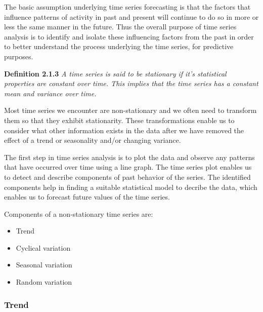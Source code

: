       \vspace{1em}

      The basic assumption underlying time series forecasting is that the factors that influence patterns of activity in past and present will continue to do so in more or less the same manner in the future. Thus the overall purpose of time series analysis is to identify and isolate these influencing factors from the past in order to better understand the process underlying the time series, for predictive purposes.

      \vspace{1em}

      \textbf{Definition 2.1.3} \cite{Watson2025} \textit{A time series is said to be stationary if it's statistical properties are constant over time. This implies that the time series has a constant mean and variance over time.}

      \vspace{1em}

      Most time series we encounter are non-stationary and we often need to transform them so that they exhibit stationarity. These transformations enable us to consider what other information exists in the data after we have removed the effect of a trend or seasonality and/or changing variance.

      \vspace{1em}

      The first step in time series analysis is to plot the data and observe any patterns that have occurred over time using a line graph. The time series plot enables us to detect and describe components of past behavior of the series. The identified components help in finding a suitable statistical model to decribe the data, which enables us to forecast future values of the time series.

      \vspace{1em}

      Components of a non-stationary time series are:
      \begin{itemize}
         \item Trend
         \item Cyclical variation
         \item Seasonal variation
         \item Random variation
      \end{itemize}

      \subsubsection{Trend}

